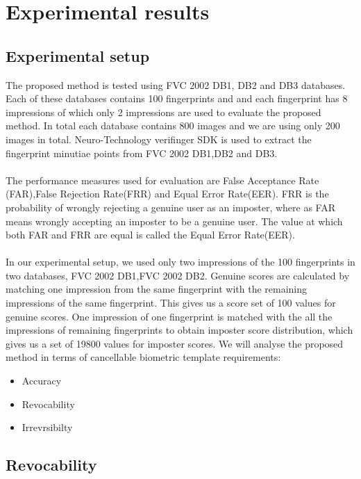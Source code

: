 \documentclass[14pt, oneside]{article}   	%
\begin{document}
\section{Experimental results}
\subsection{Experimental setup}
The proposed method is tested using FVC 2002 DB1, DB2 and DB3 databases. Each of these databases contains 100 fingerprints and and each fingerprint has 8 impressions of which only 2 impressions are used to evaluate the proposed method. In total each database contains 800 images and we are using only 200 images in total. Neuro-Technology verifinger SDK \cite{13} is used to extract the fingerprint minutiae points from FVC 2002 DB1,DB2 and DB3.
\paragraph{}
The performance measures used for evaluation are False Acceptance Rate (FAR),False Rejection Rate(FRR) and Equal Error Rate(EER).  FRR is the probability of wrongly rejecting a genuine user as 
an imposter, where as FAR means wrongly accepting an imposter to be a genuine user. The value at which both FAR and FRR are equal is called the Equal Error Rate(EER). 
\paragraph{}
In our experimental setup, we used only two impressions of the 100 fingerprints in two databases, FVC 2002 DB1,FVC 2002 DB2. Genuine scores are calculated by matching one impression from the same fingerprint with the remaining impressions of the same fingerprint. This gives us a score set of 100 values for genuine scores. One impression of one fingerprint is matched with the all the impressions of remaining fingerprints to obtain imposter score distribution, which gives us a set of 19800 values for imposter scores. We will analyse the proposed method in terms of cancellable biometric template requirements:
\begin{itemize}
\item{Accuracy}
\item{Revocability}
\item{Irrevrsibilty}
\end{itemize}

\subsection{Revocability}
\end{document}
